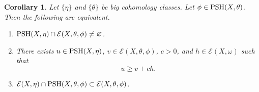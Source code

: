 \documentclass[a4paper]{amsart}
\numberwithin{equation}{section}
\newtheorem{corollary}[theorem]{Corollary}
\theoremstyle{definition}
\numberwithin{equation}{section}
\newcommand{\PSH}{{\rm PSH}}
\begin{document}






\begin{corollary}
 Let $\{\eta\}$ and $\{\theta\}$ be big cohomology classes. Let $\phi\in\PSH(X,\theta)$. Then the following are equivalent.
\hfill
\begin{enumerate}
\item $\PSH(X,\eta)\cap\mathcal{E}(X,\theta,\phi)\neq \varnothing$.

\item There exists $u\in\PSH(X,\eta)$, $v\in\mathcal{E}(X,\theta,\phi)$, $c>0$, and $h\in\mathcal{E}(X,\omega)$ such that \[u\geq v+ ch. \]

\item $\mathcal{E}(X,\eta)\cap\PSH(X,\theta,\phi)\subset \mathcal{E}(X,\theta,\phi)$.
\end{enumerate}

\end{corollary}
\end{document}
